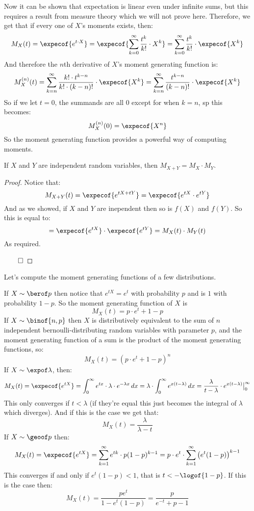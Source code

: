 Now it can be shown that expectation is linear even under infinite sums, but this requires a result from measure theory which we will
not prove here.
Therefore, we get that if every one of $X$'s moments exists, then:
\[ M_X(t) = \expecof{e^{t\cdot X}} = \expecof{\sum_{k=0}^\infty \frac{t^k}{k!}\cdot X^k} =
\sum_{k=0}^\infty \frac{t^k}{k!}\cdot \expecof{X^k} \]
And therefore the $n$th derivative of $X$'s moment generating function is:
\[ M_X^{(n)}(t) = \sum_{k=n}^\infty \frac{k!\cdot t^{k-n}}{k!\cdot(k-n)!}\cdot\expecof{X^k} =
\sum_{k=n}^\infty \frac{t^{k-n}}{(k-n)!}\cdot\expecof{X^k} \]
So if we let $t=0$, the summands are all $0$ except for when $k=n$, sp this becomes:
\[ M_X^{(n)}(0) = \expecof{X^n} \]
So the moment generating function provides a powerful way of computing moments.

\begin{prop*}

	If $X$ and $Y$ are independent random variables, then $M_{X+Y}=M_X\cdot M_Y$.

\end{prop*}

\begin{proof}

	Notice that:
	\[ M_{X+Y}(t) = \expecof{e^{tX+tY}} = \expecof{e^{tX}\cdot e^{tY}} \]
	And as we showed, if $X$ and $Y$ are inependent then so is $f(X)$ and $f(Y)$.
	So this is equal to:
	\[ = \expecof{e^{tX}}\cdot\expecof{e^{tY}} = M_X(t)\cdot M_Y(t) \]
	As required.

	\hfill$\qed$

\end{proof}

Let's compute the moment generating functions of a few distributions.
\begin{msecitemize}
	\mitem If $X\sim\berof p$ then notice that $e^{tX}=e^t$ with probability $p$ and is $1$ with probability $1-p$.
	So the moment generating function of $X$ is
		\[ M_X(t) = p\cdot e^t + 1 - p \]
	\mitem If $X\sim\binof{n,p}$ then $X$ is distributively equivalent to the sum of $n$ independent bernoulli-distributing
		random variables with parameter $p$, and the moment generating function of a sum is the product of the moment generating
		functions, so:
		\[ M_X(t) = (p\cdot e^t + 1 - p)^n \]
	\mitem If $X\sim\expof\lambda$, then:
		\[ M_X(t) = \expecof{e^{tX}} = \int_0^\infty e^{tx}\cdot\lambda\cdot e^{-\lambda x}\,dx =
		\lambda\cdot\int_0^\infty e^{x(t-\lambda)}\,dx = \frac{\lambda}{t-\lambda}\cdot e^{x(t-\lambda)}\big|_0^\infty \]
		This only converges if $t<\lambda$ (if they're equal this just becomes the integral of $\lambda$ which diverges).
		And if this is the case we get that:
		\[ M_X(t) = \frac\lambda{\lambda - t} \]
	\mitem If $X\sim\geoof p$ then:
		\[ M_X(t) = \expecof{e^{tX}} = \sum_{k=1}^\infty e^{tk}\cdot p(1-p)^{k-1} =
		p\cdot e^t\cdot\sum_{k=1}^\infty \big(e^t(1-p)\big)^{k-1} \]
		This converges if and only if $e^t(1-p)<1$, that is $t<-\logof{1-p}$.
		If this is the case then:
		\[ M_X(t) = \frac{pe^t}{1-e^t(1-p)} = \frac{p}{e^{-t}+p-1} \]
\end{msecitemize}

